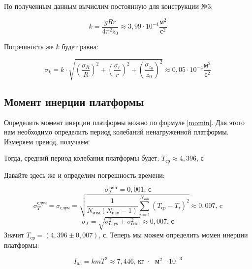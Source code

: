	\bigskip
	
	По полученным данным вычислим постоянную для конструкции №3:
	
	\begin{equation}
		k = \frac{gRr}{4\pi^2z_0} \approx 3,99\cdot 10^{-4} \frac{\text{м}^2}{\text{с}^2}
	\end{equation}
	
	Погрешность же $k$ будет равна:
	
	\begin{equation}
		\sigma_k = k \cdot \sqrt{\left( \frac{\sigma_R}{R}\right)^2 + \left( \frac{\sigma_r}{r}\right)^2 + \left( \frac{\sigma_{z_0}}{z_0}\right)^2} \approx 0,05 \cdot 10^{-4} \frac{\text{м}^2}{\text{с}^2}
	\end{equation}
	
	\subsection{Момент инерции платформы}
	
	Определить момент инерции платформы можно по формуле \eqref{momin}. Для этого нам необходимо определить период колебаний ненагруженной платформы. Измеряем преиод, получаем:
	

	
	Тогда, средний период колебания платформы будет: $T_\text{ср} \approx 4,396\text{, с}$
	
	Давайте здесь же и определим погрешность времени: 
	
	\begin{equation}
		\sigma_T^{\text{сист}} = 0,001\text{, с}
	\end{equation}
	\begin{equation}
		\sigma_T^{\text{случ}} = \sigma_\text{случ}=\sqrt{\frac{1}{  N_\text{изм} \left( N_\text{изм} - 1 \right)}\sum_{i=1}^{N_\text{изм}}\left( T_\text{ср} - T_i \right)^2 } \approx 0,007\text{, c}
	\end{equation}
	\begin{equation}
		\sigma_T = \sqrt{\sigma_\text{случ}^{2} + \sigma_{\text{сист}}^{2}} \approx 0,007\text{, с}
	\end{equation}
	Значит $T_\text{ср} = \left(4,396 \pm 0,007\right)\text{, с}$. Теперь мы можем определить момен инерции платформы:
	
	\begin{equation}
		I_\text{пл} = kmT^2 \approx 7,446  \text{,  кг $\cdot$ $\text{м}^2$ $\cdot 10^{-3}$}  
	\end{equation}
	

